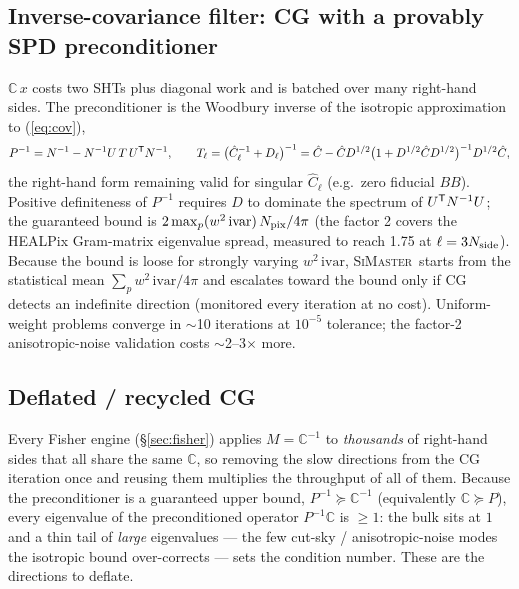 \documentclass[11pt,a4paper]{article}
\newcommand{\C}{\mathbb{C}}
\newcommand{\simaster}{\textsc{SiMaster}}
\begin{document}
\subsection{Inverse-covariance filter: CG with a provably SPD preconditioner}
\label{sec:cg}
$\C\,x$ costs two SHTs plus diagonal work and is batched over many
right-hand sides.  The preconditioner is the Woodbury inverse of the
isotropic approximation to (\ref{eq:cov}),
\begin{equation}
  P^{-1} = N^{-1} - N^{-1} U\, T\, U^{\sf T} N^{-1},\qquad
  T_\ell = \big(\hat C_\ell^{-1} + D_\ell\big)^{-1}
  = \hat C - \hat C D^{1/2}\big(1+D^{1/2}\hat C D^{1/2}\big)^{-1}D^{1/2}\hat C,
\end{equation}
the right-hand form remaining valid for singular $\hat C_\ell$ (e.g.\ zero
fiducial $BB$).  Positive definiteness of $P^{-1}$ requires $D$ to dominate
the spectrum of $U^{\sf T}N^{-1}U$; the guaranteed bound is
$2\max_p(w^2\,\mathrm{ivar})\,N_{\rm pix}/4\pi$ (the factor 2 covers the
HEALPix Gram-matrix eigenvalue spread, measured to reach 1.75 at
$\ell=3N_{\rm side}$).  Because the bound is loose for strongly varying
$w^2\,\mathrm{ivar}$, \simaster\ starts from the statistical mean
$\sum_p w^2\,\mathrm{ivar}/4\pi$ and escalates toward the bound only if CG
detects an indefinite direction (monitored every iteration at no cost).
Uniform-weight problems converge in $\sim$10 iterations at
$10^{-5}$ tolerance; the factor-2 anisotropic-noise validation costs
$\sim$2--3$\times$ more.

\subsection{Deflated / recycled CG}
\label{sec:deflation}
Every Fisher engine (\S\ref{sec:fisher}) applies $M=\C^{-1}$ to
\emph{thousands} of right-hand sides that all share the same $\C$, so
removing the slow directions from the CG iteration once and reusing them
multiplies the throughput of all of them.  Because the preconditioner is a
guaranteed upper bound, $P^{-1}\succeq\C^{-1}$ (equivalently $\C\succeq P$),
every eigenvalue of the preconditioned operator $P^{-1}\C$ is $\ge1$: the
bulk sits at $1$ and a thin tail of \emph{large} eigenvalues --- the few
cut-sky / anisotropic-noise modes the isotropic bound over-corrects ---
sets the condition number.  These are the directions to deflate.
\end{document}
